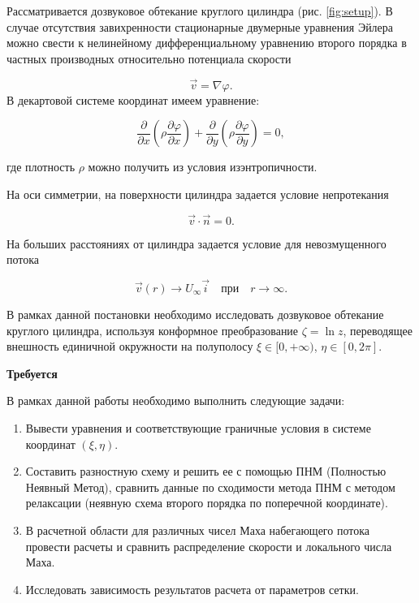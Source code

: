 \documentclass[a4paper,12pt]{article}
\begin{document}
	Рассматривается дозвуковое обтекание круглого цилиндра (рис. \ref{fig:setup}). В случае отсутствия завихренности стационарные двумерные уравнения Эйлера можно свести к нелинейному дифференциальному уравнению второго порядка в частных производных относительно потенциала скорости
	
	\[\vec{v} = \nabla \varphi.\]
	В декартовой системе координат имеем уравнение:
	
	\[
		\frac{\partial}{\partial x} \left( \rho \frac{\partial \varphi}{\partial x} \right) + \frac{\partial}{\partial y} \left( \rho \frac{\partial \varphi}{\partial y} \right) = 0,
	\]
	
	где плотность $\rho$ можно получить из условия изэнтропичности.
	
	На оси симметрии, на поверхности цилиндра задается условие непротекания
	
	

	\[\vec{v} \cdot \vec{n} = 0. \]	

	
	На больших расстояниях от цилиндра задается условие для невозмущенного потока
	
	
	\[ \vec{v}(r) \to U_{\infty} \vec{i} \quad \text{при} \quad r \to \infty.\]	
	
	
	В рамках данной постановки необходимо исследовать дозвуковое обтекание круглого цилиндра, используя конформное преобразование $\zeta = \ln z$, переводящее внешность единичной окружности на полуполосу $\xi \in [0, +\infty)$, $\eta \in [0, 2\pi]$.
	
	\textbf{Требуется}
	
	В рамках данной работы необходимо выполнить следующие задачи:
	
	\begin{enumerate}
		\item Вывести уравнения и соответствующие граничные условия в системе координат \((\xi, \eta)\).
		\item Составить разностную схему и решить ее с помощью ПНМ (Полностью Неявный Метод),
		сравнить данные по сходимости метода ПНМ с методом релаксации (неявную схема второго
		порядка по поперечной координате).
		\item В расчетной области для различных чисел Маха набегающего потока провести расчеты и сравнить распределение скорости и локального числа Маха.
		\item Исследовать зависимость результатов расчета от параметров сетки.
	\end{enumerate}
	
\end{document}
